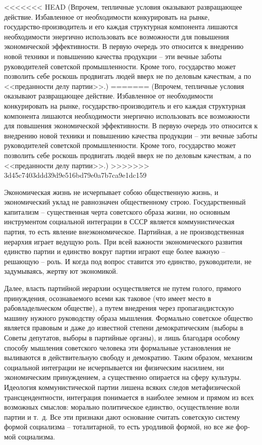 \documentclass{book}
\begin{document}
<<<<<<< HEAD
(Впрочем, тепличные условия оказывают развращающее действие. Избавленное от необходимости конкурировать на рынке, государство‑производитель и его каждая структурная компонента лишаются необходимости энергично использовать все возможности для повышения экономической эффективности. В первую очередь это относится к внедрению новой техники и повышению качества продукции -- эти вечные заботы руководителей советской промышленности. Кроме того, государство может позволить себе роскошь продвигать людей вверх не по деловым качествам, а по <<преданности делу партии>>.)
=======
(Впрочем, тепличные условия оказывают развращающее действие. Избавленное от необходимости конкурировать на рынке, государство-производитель и его каждая структурная компонента лишаются необходимости энергично использовать все возможности для повышения экономической эффективности. В первую очередь это относится к внедрению новой техники и повышению качества продукции -- эти вечные заботы руководителей советской промышленности. Кроме того, государство может позволить себе роскошь продвигать людей вверх не по деловым качествам, а по <<преданности делу партии>>.)
>>>>>>> 3d45c7403ddd39d9e516bd79e0a7b7ca9e1dc159

Экономическая жизнь не исчерпывает собою общественную жизнь, и экономический уклад не равнозначен общественному строю. Государственный капитализм -- существенная черта советского образа жизни, но основным инструментом социальной интеграции в СССР является коммунистическая партия, то есть явление внеэкономическое. Партийная, а не производственная иерархия играет ведущую роль. При всей важности экономического развития единство партии и единство вокруг партии играют еще более важную -- решающую -- роль. И ког­да под вопрос ставится это единство, руководители, не заду­мываясь, жертву ют экономикой.

Далее, власть партийной иерархии осуществляется не путем голого, прямого принуждения, осознаваемого всеми как тако­вое (что имеет место в рабовладельческом обществе), а путем внедрения через пропагандистскую машину нужного руко­водству образа мышления. Формально советское общество является правовым и даже до известной степени демократи­ческим (выборы в Советы депутатов, выборы в партийные органы), и лишь благодаря особому способу мышления совет­ского человека эти формальные установления не выливаются в действительную свободу и демократию. Таким образом, ме­ханизм социальной интеграции не исчерпывается ни физиче­ским насилием, ни экономическим принуждением, а существен­но опирается на сферу культуры. Идеология коммунистиче­ской партии лишена всяких следов метафизической трансцен­дентности, интеграция понимается в наиболее земном и пря­мом из всех возможных смыслов: морально политическое единство, осуществление воли партии и т.~д. Все эти признаки дают основание считать советскую систему формой социализ­ма -- 
тоталитарной, то есть уродливой формой, но все же фор­мой социализма.
\end{document}

